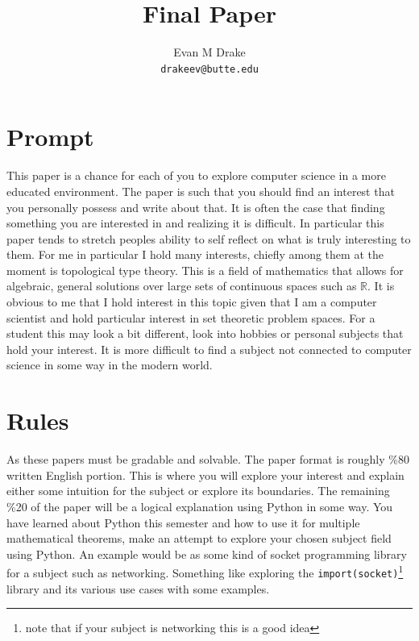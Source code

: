 \documentclass[12pt]{article}
\title{Final Paper}
\author{
	Evan M Drake \\
	\texttt{drakeev@butte.edu}
}
\begin{document}
	\maketitle


	\section{Prompt}
		\indent This paper is a chance for each of you to explore computer science in a more educated environment.
		The paper is such that you should find an interest that you personally possess and write about that.
		It is often the case that finding something you are interested in and realizing it is difficult.
		In particular this paper tends to stretch peoples ability to self reflect on what is truly interesting to them.
		For me in particular I hold many interests, chiefly among them at the moment is topological type theory.
		This is a field of mathematics that allows for algebraic, general solutions over large sets of continuous spaces such as $\mathbb{R}$.
		It is obvious to me that I hold interest in this topic given that I am a computer scientist and hold particular interest in set theoretic problem spaces.
		For a student this may look a bit different,
			look into hobbies or personal subjects that hold your interest.
		It is more difficult to find a subject not connected to computer science in some way in the modern world.
	
	\section{Rules}
		\indent As these papers must be gradable and solvable.
		The paper format is roughly \%80 written English portion.
		This is where you will explore your interest and explain either some intuition for the subject or explore its boundaries.
		The remaining \%20 of the paper will be a logical explanation using Python in some way.
		You have learned about Python this semester and how to use it for multiple mathematical theorems,
			make an attempt to explore your chosen subject field using Python.
		An example would be as some kind of socket programming library for a subject such as networking.
		Something like exploring the \verb|import(socket)|\footnote{note that if your subject is networking this is a good idea}
			library and its various use cases with some examples.

\end{document}

